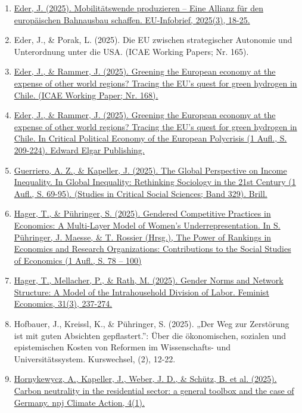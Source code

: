 \begin{enumerate}
	 \item \href{https://emedien.arbeiterkammer.at/viewer/image/AC05712646_2025_3/18/#topDocAnchor}{Eder, J. (2025). Mobilitätswende produzieren – Eine Allianz für den europäischen Bahnausbau schaffen. EU-Infobrief, 2025(3), 18-25.}
	 \item Eder, J., \& Porak, L. (2025). Die EU zwischen strategischer Autonomie und Unterordnung unter die USA. (ICAE Working Papers; Nr. 165).
	 \item \href{https://www.jku.at/fileadmin/gruppen/108/ICAE_Working_Papers/wp168.pdf}{Eder, J., \& Rammer, J. (2025). Greening the European economy at the expense of other world regions? Tracing the EU's quest for green hydrogen in Chile. (ICAE Working Paper; Nr. 168).}
	 \item \href{https://doi.org/10.4337/9781035347940_14}{Eder, J., \& Rammer, J. (2025). Greening the European economy at the expense of other world regions? Tracing the EU’s quest for green hydrogen in Chile. In Critical Political Economy of the European Polycrisis (1 Aufl., S. 209-224). Edward Elgar Publishing.}
	 \item \href{https://doi.org/10.1163/9789004733626_004}{Guerriero, A. Z., \& Kapeller, J. (2025). The Global Perspective on Income Inequality. In Global Inequality: Rethinking Sociology in the 21st Century (1 Aufl., S. 69-95). (Studies in Critical Social Sciences; Band 329). Brill.}
	 \item \href{https://doi.org/10.4324/9781032637310-7}{Hager, T., \& Pühringer, S. (2025). Gendered Competitive Practices in Economics: A Multi-Layer Model of Women's Underrepresentation. In S. Pühringer, J. Maesse, \& T. Rossier (Hrsg.), The Power of Rankings in Economics and Research Organizations: Contributions to the Social Studies of Economics (1 Aufl., S. 78 -- 100)}
	 \item \href{https://doi.org/10.1080/13545701.2025.2549406}{Hager, T., Mellacher, P., \& Rath, M. (2025). Gender Norms and Network Structure: A Model of the Intrahousehold Division of Labor. Feminist Economics, 31(3), 237-274.}
	 \item Hofbauer, J., Kreissl, K., \& Pühringer, S. (2025). „Der Weg zur Zerstörung ist mit guten Absichten gepflastert.”: Über die ökonomischen, sozialen und epistemischen Kosten von Reformen im Wissenschafts- und Universitätssystem. Kurswechsel, (2), 12-22.
	 \item \href{https://doi.org/10.1038/s44168-025-00229-2}{Hornykewycz, A., Kapeller, J., Weber, J. D., \& Schütz, B. et al. (2025). Carbon neutrality in the residential sector: a general toolbox and the case of Germany. npj Climate Action, 4(1).}

\end{enumerate}
